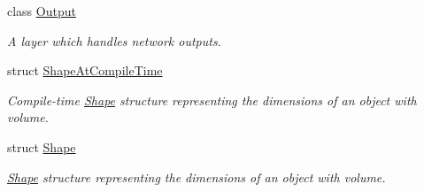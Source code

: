 \begin{DoxyCompactItemize}
class \hyperlink{classffnn_1_1layer_1_1_output}{Output}
\begin{DoxyCompactList}\small\item\em A layer which handles network outputs. \end{DoxyCompactList}\item 
struct \hyperlink{structffnn_1_1layer_1_1_shape_at_compile_time}{Shape\-At\-Compile\-Time}
\begin{DoxyCompactList}\small\item\em Compile-\/time \hyperlink{structffnn_1_1layer_1_1_shape}{Shape} structure representing the dimensions of an object with volume. \end{DoxyCompactList}\item 
struct \hyperlink{structffnn_1_1layer_1_1_shape}{Shape}
\begin{DoxyCompactList}\small\item\em \hyperlink{structffnn_1_1layer_1_1_shape}{Shape} structure representing the dimensions of an object with volume. \end{DoxyCompactList}\end{DoxyCompactItemize}
